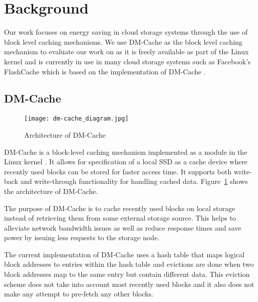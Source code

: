 \section{Background}

Our work focuses on energy saving in cloud storage systems through the use of
block level caching mechanisms. We use DM-Cache as the block level caching
mechanism to evaluate our work on as it is freely available as part of the Linux
kernel and is currently in use in many cloud storage systems such as Facebook's
FlashCache which is based on the implementation of DM-Cache \cite{flashcache}.

\subsection{DM-Cache}

\begin{figure}
  \caption{Architecture of DM-Cache}
  \centering \texttt{[image: dm-cache\_diagram.jpg]}
  \label{fig:dm-cache}
\end{figure}

DM-Cache is a block-level caching mechanism implemented as a module in the Linux
kernel \cite{DM-Cache}. It allows for specification of a local SSD as a cache
device where recently used blocks can be stored for faster access time. It
supports both write-back and write-through functionality for handling cached
data. Figure~\ref{fig:dm-cache} shows the architecture of DM-Cache.

The purpose of DM-Cache is to cache recently used blocks on local storage
instead of retrieving them from some external storage source. This helps to
alleviate network bandwidth issues as well as reduce response times and save
power by issuing less requests to the storage node.

The current implementation of DM-Cache uses a hash table that maps logical block
addresses to entries within the hash table and evictions are done when two block
addresses map to the same entry but contain different data. This eviction scheme
does not take into account most recently used blocks and it also does not make
any attempt to pre-fetch any other blocks.
